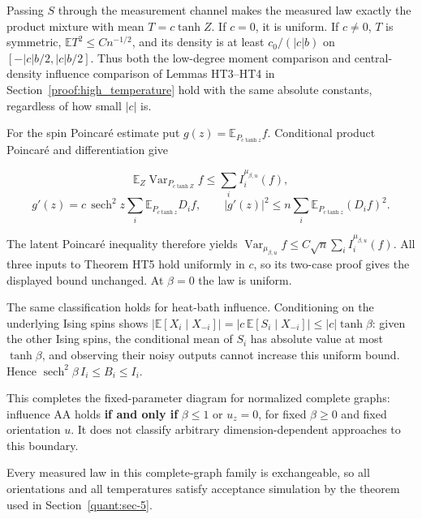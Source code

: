 Passing \(S\) through the measurement channel makes the measured law
exactly the product mixture with mean \(T=c\tanh Z\). If \(c=0\), it is
uniform. If \(c\ne0\), \(T\) is symmetric,
\(\mathbb ET^2\le Cn^{-1/2}\), and its density is at least
\(c_0/(|c|b)\) on \([-|c|b/2,|c|b/2]\). Thus both the low-degree moment
comparison and central-density influence comparison of Lemmas HT3--HT4
in Section~\ref{proof:high_temperature} hold with the same
absolute constants, regardless of how small \(|c|\) is.

For the spin Poincaré estimate put \(g(z)=\mathbb E_{P_{c\tanh z}}f\).
Conditional product Poincaré and differentiation give

\[
\mathbb E_Z\operatorname{Var}_{P_{c\tanh Z}}f\le\sum_i I_i^{\mu_{\beta,u}}(f),
\] \[
g'(z)=c\,\operatorname{sech}^2z\sum_i\mathbb E_{P_{c\tanh z}}D_if,
\qquad
|g'(z)|^2\le n\sum_i\mathbb E_{P_{c\tanh z}}(D_if)^2.
\]

The latent Poincaré inequality therefore yields
\(\operatorname{Var}_{\mu_{\beta,u}}f\le C\sqrt n\sum_i I_i^{\mu_{\beta,u}}(f)\).
All three inputs to Theorem HT5 hold uniformly in \(c\), so its two-case
proof gives the displayed bound unchanged. At \(\beta=0\) the law is
uniform.

The same classification holds for heat-bath influence. Conditioning on
the underlying Ising spins shows \(|\mathbb E[X_i\mid X_{-i}]|
=|c\,\mathbb E[S_i\mid X_{-i}]|\le |c|\tanh\beta\): given the other
Ising spins, the conditional mean of \(S_i\) has absolute value at most
\(\tanh\beta\), and observing their noisy outputs cannot increase this
uniform bound. Hence \(\operatorname{sech}^2\beta\,I_i\le B_i\le I_i\).

This completes the fixed-parameter diagram for normalized complete
graphs: influence AA holds \textbf{if and only if} \(\beta\le1\) or
\(u_z=0\), for fixed \(\beta\ge0\) and fixed orientation \(u\). It does
not classify arbitrary dimension-dependent approaches to this boundary.

Every measured law in this complete-graph family is exchangeable, so all
orientations and all temperatures satisfy acceptance simulation by the
theorem used in Section~\ref{quant:sec-5}.
